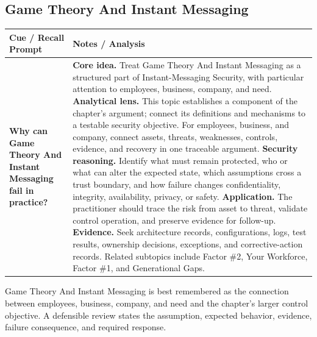 \documentclass[11pt]{article}
\newcommand{\CornellHeader}{%
\rowcolor{Navy}\color{white}\bfseries Cue / Recall Prompt & \color{white}\bfseries Notes / Analysis\\\hline}
\newcommand{\CornellRow}[2]{%
\cellcolor{CueGray}\RaggedRight\textbf{#1} & \RaggedRight #2\\\hline}
\begin{document}
\subsection*{Game Theory And Instant Messaging}
\begin{longtable}{>{\RaggedRight\arraybackslash}p{}|>{\RaggedRight\arraybackslash}p{}}
\CornellHeader
\CornellRow{Why can Game Theory And Instant Messaging fail in practice?}{\textbf{Core idea.} Treat Game Theory And Instant Messaging as a structured part of Instant-Messaging Security, with particular attention to employees, business, company, and need. \textbf{Analytical lens.} This topic establishes a component of the chapter's argument; connect its definitions and mechanisms to a testable security objective. For employees, business, and company, connect assets, threats, weaknesses, controls, evidence, and recovery in one traceable argument. \textbf{Security reasoning.} Identify what must remain protected, who or what can alter the expected state, which assumptions cross a trust boundary, and how failure changes confidentiality, integrity, availability, privacy, or safety. \textbf{Application.} The practitioner should trace the risk from asset to threat, validate control operation, and preserve evidence for follow-up. \textbf{Evidence.} Seek architecture records, configurations, logs, test results, ownership decisions, exceptions, and corrective-action records. Related subtopics include Factor \#2, Your Workforce, Factor \#1, and Generational Gaps.}
\end{longtable}
\begin{topicsummary}
Game Theory And Instant Messaging is best remembered as the connection between employees, business, company, and need and the chapter's larger control objective. A defensible review states the assumption, expected behavior, evidence, failure consequence, and required response.
\end{topicsummary}
\end{document}
